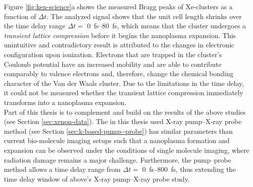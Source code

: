 Figure \ref{fig:ken-science}a shows the measured Bragg peaks of Xe-clusters as a function of $\Delta t$. The analyzed signal shows that the unit cell length shrinks over the time delay range $\Delta t =$ \SIrange{0}{80}{\femto\second}, which means that the cluster undergoes a \textit{transient lattice compression} before it begins the nanoplasma expansion. This unintuitive and contradictory result is attributed to the changes in electronic configuration upon ionization. Electrons that are trapped in the cluster's Coulomb potential have an increased mobility and are able to contribute comparably to valence electrons and, therefore, change the chemical bonding character of the Van der Waals cluster. Due to the limitations in the time delay, it could not be measured whether the transient lattice compression immediately transforms into a nanoplasma expansion.\\[1\baselineskip]
Part of this thesis is to complement and build on the results of the above studies (see Section \ref{sec:xenon-data}). The in this thesis used X-ray pump--X-ray probe method (see Section \ref{sec:k-based-pump--probe}) has similar parameters than current bio-molecule imaging setups such that a nanoplasma formation and expansion can be observed under the conditions of single molecule imaging, where radiation damage remains a major challenge. Furthermore, the pump--probe method allows a time delay range from $\Delta t=$ \SIrange{0}{800}{\femto\second}, thus extending the time delay window of above's X-ray pump--X-ray probe study.
%
%
%

